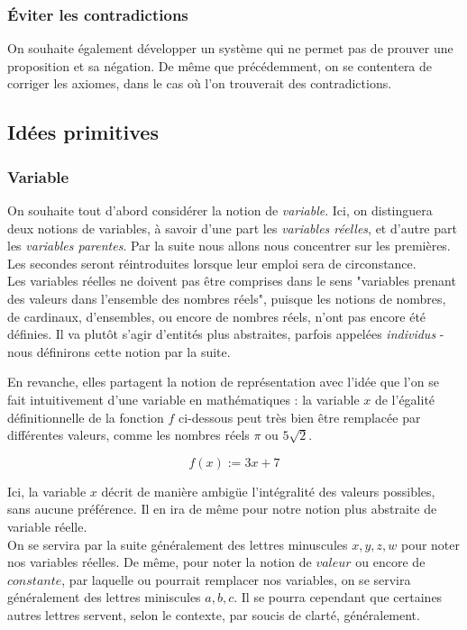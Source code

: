 \documentclass{article}
\begin{document}
\subsubsection{Éviter les contradictions}

On souhaite également développer un système qui ne permet pas de prouver une proposition et sa négation. De même que précédemment, on se contentera de corriger les axiomes, dans le cas où l'on trouverait des contradictions.

\subsection{Idées primitives}

\subsubsection{Variable}

On souhaite tout d'abord considérer la notion de \textit{variable}. Ici, on distinguera deux notions de variables, à savoir d'une part les \textit{variables réelles}, et d'autre part les \textit{variables parentes}. Par la suite nous allons nous concentrer sur les premières. Les secondes seront réintroduites lorsque leur emploi sera de circonstance.
\\

Les variables réelles ne doivent pas être comprises dans le sens "variables prenant des valeurs dans l'ensemble des nombres réels", puisque les notions de nombres, de cardinaux, d'ensembles, ou encore de nombres réels, n'ont pas encore été définies. Il va plutôt s'agir d'entités plus abstraites, parfois appelées \textit{individus} - nous définirons cette notion par la suite. 

En revanche, elles partagent la notion de représentation avec l'idée que l'on se fait intuitivement d'une variable en mathématiques : la variable $x$ de l'égalité définitionnelle de la fonction $f$ ci-dessous peut très bien être remplacée par différentes valeurs, comme les nombres réels $\pi$ ou $5\sqrt{2}$.

$$f(x) := 3x + 7$$

Ici, la variable $x$ décrit de manière ambigüe l'intégralité des valeurs possibles, sans aucune préférence. Il en ira de même pour notre notion plus abstraite de variable réelle.
\\

On se servira par la suite généralement des lettres minuscules $x,y,z,w$ pour noter nos variables réelles. De même, pour noter la notion de $valeur$ ou encore de $constante$, par laquelle ou pourrait remplacer nos variables, on se servira généralement des lettres miniscules $a,b,c$. Il se pourra cependant que certaines autres lettres servent, selon le contexte, par soucis de clarté, généralement.
\end{document}

